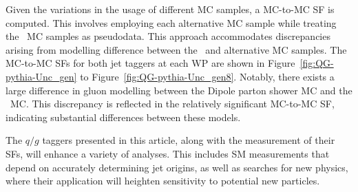 Given the variations in the usage of different MC samples, a MC-to-MC SF is computed. This involves employing each alternative MC sample while treating the \pythia~MC samples as pseudodata. This approach accommodates discrepancies arising from modelling difference between the \pythia~and alternative MC samples. The MC-to-MC SFs for both jet taggers at each WP are shown in Figure~\ref{fig:QG-pythia-Unc_gen} to Figure~\ref{fig:QG-pythia-Unc_gen8}. Notably, there exists a large difference in gluon modelling between the \herwig Dipole parton shower MC and the \pythia~MC. This discrepancy is reflected in the relatively significant MC-to-MC SF, indicating substantial differences between these models.

The $𝑞/g$ taggers presented in this article, along with the measurement of their SFs, will enhance a variety of analyses. This includes SM measurements that depend on accurately determining jet origins, as well as searches for new physics, where their application will heighten sensitivity to potential new particles.

